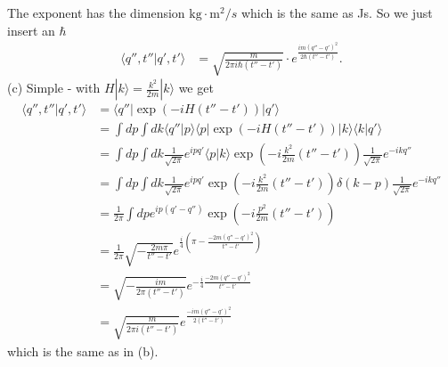 \documentclass[10pt,a4paper]{book}
\theoremstyle{definition}
\begin{document}
The exponent has the dimension $\text{kg}\cdot\text{m}^2/s$ which is the same as Js. So we just insert an $\hbar$
\begin{align}
\langle q'',t''|q',t'\rangle
&=\sqrt{\frac{m}{2\pi i\hbar(t''-t')}}\cdot e^{\frac{im(q''-q')^2}{2\hbar(t''-t')}}.
\end{align}
(c) Simple - with $H|k\rangle=\frac{k^2}{2m}|k\rangle$ we get
\begin{align}
\langle q'',t''|q',t'\rangle
&=\langle q''|\exp(-iH(t''-t'))|q'\rangle\\
&=\int dp\int dk\langle q''|p\rangle\langle p|\exp(-iH(t''-t'))|k\rangle\langle k|q'\rangle\\
&=\int dp\int dk\frac{1}{\sqrt{2\pi}}e^{ipq'}\langle p|k\rangle\exp(-i\frac{k^2}{2m}(t''-t'))\frac{1}{\sqrt{2\pi}}e^{-ikq''}\\
&=\int dp\int dk\frac{1}{\sqrt{2\pi}}e^{ipq'}\exp(-i\frac{k^2}{2m}(t''-t'))\delta(k-p)\frac{1}{\sqrt{2\pi}}e^{-ikq''}\\
&=\frac{1}{2\pi}\int dpe^{ip(q'-q'')}\exp(-i\frac{p^2}{2m}(t''-t'))\\
&=\frac{1}{2\pi}\sqrt{-\frac{2m\pi}{t''-t'}}e^{\frac{i}{4}\left(\pi-\frac{-2m(q''-q')^2}{t''-t'}\right)}\\
&=\sqrt{-\frac{im}{2\pi(t''-t')}}e^{-\frac{i}{4}\frac{-2m(q''-q')^2}{t''-t'}}\\
&=\sqrt{\frac{m}{2\pi i(t''-t')}}e^{\frac{-im(q''-q')^2}{2(t''-t')}}
\end{align}
which is the same as in (b).
\end{document}
